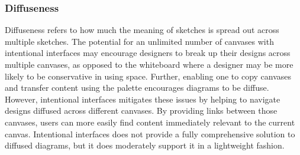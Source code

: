 \documentclass[12pt,fleqn]{ucithesis}
\begin{document}

\subsubsection{Diffuseness}
Diffuseness refers to how much the meaning of sketches is spread out across multiple sketches. The potential for an unlimited number of canvases with intentional interfaces may encourage designers to break up their designs across multiple canvases, as opposed to the whiteboard where a designer may be more likely to be conservative in using space. Further, enabling one to copy canvases and transfer content using the palette encourages diagrams to be diffuse. However, intentional interfaces mitigates these issues by helping to navigate designs diffused across different canvases. By providing links between those  canvases, users can more easily find content immediately relevant to the current canvas. Intentional interfaces does not provide a fully comprehensive solution to diffused diagrams, but it does moderately support it in a lightweight fashion.


\end{document}
